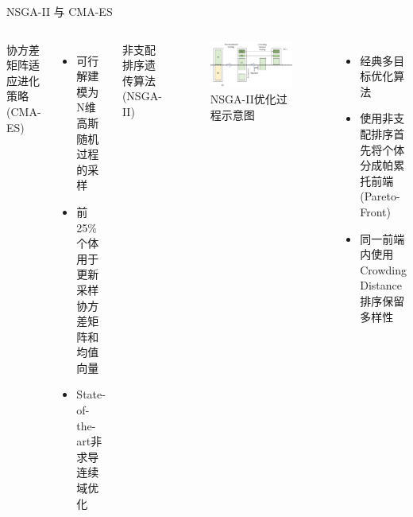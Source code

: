 \documentclass[10pt]{beamer}
\begin{document}
\begin{frame}{NSGA-II 与 CMA-ES}

  \begin{columns}[T, onlytextwidth]
    \vspace{-0.5cm}
      \begin{center}
        协方差矩阵适应进化策略(CMA-ES)
      \end{center}
      {\fontsize{8}{10}
      \begin{itemize}
        \item 可行解建模为N维高斯随机过程的采样
        \item 前25\%个体用于更新采样协方差矩阵和均值向量
        \item State-of-the-art非求导连续域优化
      \end{itemize}
      }

    \vspace{-0.5cm}
    \begin{center}
      非支配排序遗传算法(NSGA-II)
    \end{center}
    \begin{figure}
      \includegraphics[width=\textwidth]{img/NSGA-II.pdf}
      \caption{NSGA-II优化过程示意图}
    \end{figure}

    {\fontsize{8}{10}
    \begin{itemize}
      \item 经典多目标优化算法
      \item 使用非支配排序首先将个体分成帕累托前端 (Pareto-Front)
      \item 同一前端内使用Crowding Distance排序保留多样性
    \end{itemize}
    }

  \end{columns}
  

\end{frame}
\end{document}
